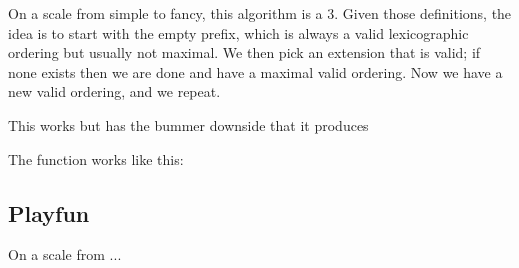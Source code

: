 \documentclass[twocolumn]{article}
\begin{document}
On a scale from simple to fancy, this algorithm is a 3. Given those
definitions, the idea is to start with the empty prefix, which is
always a valid lexicographic ordering but usually not maximal. We then
pick an extension that is valid; if none exists then we are done and
have a maximal valid ordering. Now we have a new valid ordering, and
we repeat.

This works but has the bummer downside that it produces 

The function works like this:

\subsection{Playfun}

On a scale from ...
\end{document}
